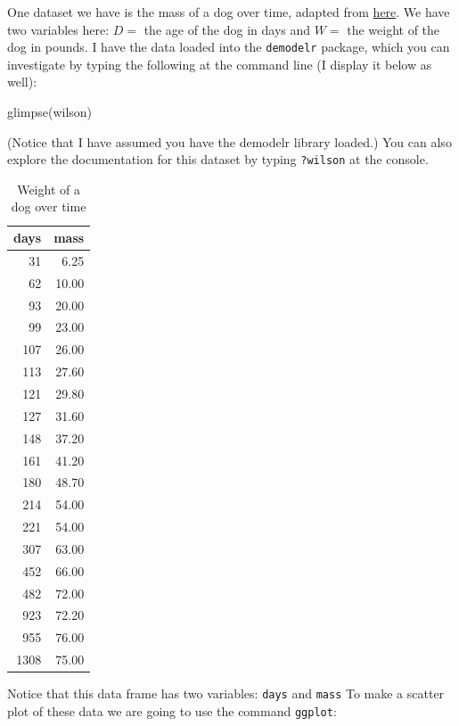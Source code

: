 \documentclass[
]{book}
\newenvironment{Shaded}{\begin{snugshade}}{\end{snugshade}}
\newcommand{\FunctionTok}[1]{\textcolor[rgb]{0.00,0.00,0.00}{#1}}
\newcommand{\NormalTok}[1]{#1}
\theoremstyle{definition}
\theoremstyle{definition}
\theoremstyle{definition}
\theoremstyle{remark}
\begin{document}
One dataset we have is the mass of a dog over time, adapted from \href{http://bscheng.com/2014/05/07/modeling-logistic-growth-data-in-r/}{here}. We have two variables here: \(D=\) the age of the dog in days and \(W=\) the weight of the dog in pounds. I have the data loaded into the \texttt{demodelr} package, which you can investigate by typing the following at the command line (I display it below as well):

\begin{Shaded}
\begin{Highlighting}[]
\FunctionTok{glimpse}\NormalTok{(wilson)}
\end{Highlighting}
\end{Shaded}

(Notice that I have assumed you have the demodelr library loaded.) You can also explore the documentation for this dataset by typing \texttt{?wilson} at the console.

\begin{table}

\caption{\label{tab:unnamed-chunk-28}Weight of a dog over time}
\centering
\begin{tabular}[t]{r|r}
\hline
days & mass\\
\hline
31 & 6.25\\
\hline
62 & 10.00\\
\hline
93 & 20.00\\
\hline
99 & 23.00\\
\hline
107 & 26.00\\
\hline
113 & 27.60\\
\hline
121 & 29.80\\
\hline
127 & 31.60\\
\hline
148 & 37.20\\
\hline
161 & 41.20\\
\hline
180 & 48.70\\
\hline
214 & 54.00\\
\hline
221 & 54.00\\
\hline
307 & 63.00\\
\hline
452 & 66.00\\
\hline
482 & 72.00\\
\hline
923 & 72.20\\
\hline
955 & 76.00\\
\hline
1308 & 75.00\\
\hline
\end{tabular}
\end{table}

Notice that this data frame has two variables: \texttt{days} and \texttt{mass}
To make a scatter plot of these data we are going to use the command \texttt{ggplot}:
\end{document}
